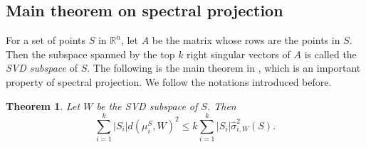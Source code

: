 \documentclass[11pt,letter]{article}
\newtheorem{theorem}{Theorem}
\begin{document}
\subsection{Main theorem on spectral projection}

For a set of points $S$ in $\mathbb R^n$, let $A$ be the matrix whose rows are the points in $S$. Then the subspace spanned by the top $k$ right singular vectors of $A$ is called the \emph{SVD subspace} of $S$. The following is the main theorem in \cite{Kannan08spectral}, which is an important property of spectral projection. We follow the notations introduced before.

\begin{theorem}\label{thm:spectral-svd}
Let $W$ be the SVD subspace of $S$. Then
\[
\sum_{i=1}^k |S_i| d(\mu_i^S, W)^2 \le k \sum_{i=1}^k |S_i| \hat \sigma_{i, W}^2(S).
\]
\end{theorem}
\end{document}

